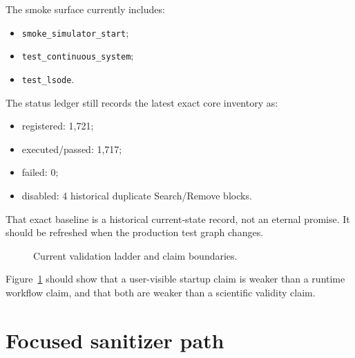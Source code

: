 The smoke surface currently includes:
\begin{itemize}
\item \texttt{smoke\_simulator\_start};
\item \texttt{test\_continuous\_system};
\item \texttt{test\_lsode}.
\end{itemize}

The status ledger still records the latest exact core inventory as:
\begin{itemize}
\item registered: 1,721;
\item executed/passed: 1,717;
\item failed: 0;
\item disabled: 4 historical duplicate Search/Remove blocks.
\end{itemize}

That exact baseline is a historical current-state record, not an eternal
promise. It should be refreshed when the production test graph changes.

\begin{figure}[htbp]
\centering
\caption{Current validation ladder and claim boundaries.}
\label{fig:validation-ladder}
\end{figure}

Figure~\ref{fig:validation-ladder} should show that a user-visible startup
claim is weaker than a runtime workflow claim, and that both are weaker than a
scientific validity claim.

\section{Focused sanitizer path}
\label{sec:test-focused-sanitizer}

